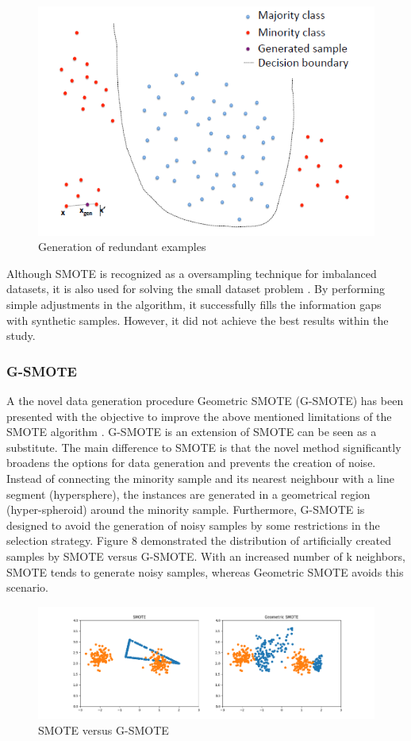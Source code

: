 \documentclass[parskip=full]{scrartcl}
\begin{document}
\begin{figure}[H]
	\centering
	\includegraphics[width=0.6\linewidth]{"./Resources/redundant_examples"}
	\caption{Generation of redundant examples}
	\label{fig:redundant-examples}
\end{figure}

Although SMOTE is recognized as a oversampling technique for imbalanced
datasets, it is also used for solving the small dataset problem \cite{Li.2018}.
By performing simple adjustments in the algorithm, it successfully fills the
information gaps with synthetic samples. However, it did not achieve the best
results within the study.

\subsubsection{G-SMOTE}

A the novel data generation procedure Geometric SMOTE (G-SMOTE) has been presented with the objective to improve the above mentioned limitations of the SMOTE algorithm \cite{Douzas.2019b}. G-SMOTE is an extension of SMOTE can be seen as a substitute. The main difference to SMOTE is that the novel method significantly broadens the options for data generation and prevents the creation of noise. Instead of connecting the minority sample and its nearest neighbour with a line segment (hypersphere), the instances are generated in a geometrical region (hyper-spheroid) around the minority sample. Furthermore, G-SMOTE is designed to avoid the generation of noisy samples by some restrictions in the selection strategy. Figure 8 demonstrated the distribution of artificially created samples by SMOTE versus G-SMOTE. With an increased number of k neighbors, SMOTE tends to generate noisy samples, whereas Geometric SMOTE avoids this scenario.

\begin{figure}[H]
	\centering
	\includegraphics[width=0.8\linewidth]{resources/smote_vs_gsmote}
	\caption{SMOTE versus G-SMOTE \cite{Douzas.2019}}
	\label{fig:smotevsgsmote}
\end{figure}
\end{document}
